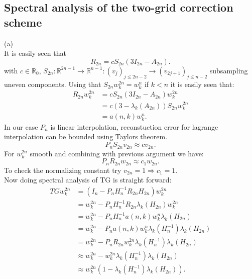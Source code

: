 \documentclass[a4paper,12pt]{article}
\begin{document}
\subsection{Spectral analysis of the two-grid correction scheme}
(a) \\
It is easily seen that
\begin{equation}
    R_{2n} =  c S_{2n} (3I_{2n} -A_{2n}).
\end{equation}
with $c \in \mathbb{R}_{0}$, $S_{2n}: \mathbb{R}^{2n-1} \rightarrow \mathbb{R}^{n-1}: (v_{j})_{j \leq 2n-2}
    \rightarrow (v_{2j+1})_{j \leq n-2}$  subsampling uneven components.
Using that $S_{2n}w_{k}^{2n} = w_{k}^{n}$ if $k<n$ it is easily seen that:
\begin{align}
    R_{2n} w_{k}^{2n} & = cS_{2n}(3I_{2n}- A_{2n}) w_{k}^{2n}         \\
                      & = c(3- \lambda_{k}(A_{2n})) S_{2n} w_{k}^{2n} \\
                      & = a(n,k) w_{k}^{n} .
\end{align}
In our case $P_{n}$ is linear interpolation, reconstuction error for lagrange interpolation can be bounded
using Taylors theorem.
\begin{equation}
    P_{n} S_{2n} v_{2n}  \approx c v_{2n}.
\end{equation}
For $w_{k}^{2n}$ smooth and combining with previous argument we have:
\begin{equation}
    P_{n} R_{2n} w_{2n}  \approx c_{1} w_{2n}.
\end{equation}
To check the normalizing constant try $v_{2n} = 1 \Rightarrow c_{1} =1$. \\
Now doing spectral analysis of TG is straight forward:
\begin{align}
    TG w_{k}^{2n} & = (I_{n} - P_{n} H_{n}^{-1} R_{2n} H_{2n}) w_{k}^{2n}                                 \\
                  & =  w_{k}^{2n} - P_{n} H_{n}^{-1} R_{2n} \lambda_{k}(H_{2n}) w_{k}^{2n}                \\
                  & =  w_{k}^{2n} - P_{n} H_{n}^{-1}  a(n,k) w_{k}^{n} \lambda_{k}(H_{2n})                \\
                  & =  w_{k}^{2n} - P_{n}  a(n,k) w_{k}^{n} \lambda_{k}(H_{n}^{-1})  \lambda_{k}(H_{2n})  \\
                  & =  w_{k}^{2n} - P_{n}  R_{2n} w_{k}^{2n} \lambda_{k}(H_{n}^{-1})  \lambda_{k}(H_{2n}) \\
                  & \approx  w_{k}^{2n} -  w_{k}^{2n} \lambda_{k}(H_{n}^{-1})  \lambda_{k}(H_{2n})        \\
                  & \approx  w_{k}^{2n} (1-   \lambda_{k}(H_{n}^{-1})  \lambda_{k}(H_{2n})).
\end{align}
\end{document}

